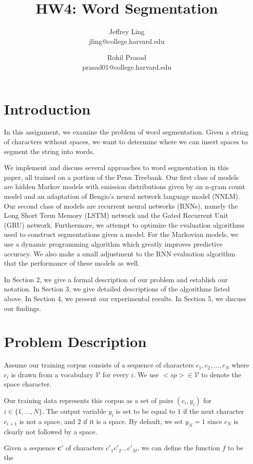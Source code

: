 \documentclass[11pt]{article}
\title{HW4: Word Segmentation}
\author{Jeffrey Ling \\ jling@college.harvard.edu \and Rohil Prasad \\ prasad01@college.harvard.edu }
\begin{document}
\maketitle{}
\section{Introduction}

In this assignment, we examine the problem of word segmentation. Given a string of characters without spaces, we want to determine where we can insert spaces to segment the string into words. 

We implement and discuss several approaches to word segmentation in this paper, all trained on a portion of the Penn Treebank. Our first class of models are hidden Markov models with emission distributions given by an n-gram count model and an adaptation of Bengio's neural network language model (NNLM). Our second class of models are recurrent neural networks (RNNs), namely the Long Short Term Memory (LSTM) network and the Gated Recurrent Unit (GRU) network. Furthermore, we attempt to optimize the evaluation algorithms used to construct segmentations given a model. For the Markovian models, we use a dynamic programming algorithm which greatly improves predictive accuracy. We also make a small adjustment to the RNN evaluation algorithm that the performance of these models as well. 

In Section 2, we give a formal description of our problem and establish our notation. In Section 3, we give detailed descriptions of the algorithms listed above. In Section 4, we present our experimental results. In Section 5, we discuss our findings.

\section{Problem Description}

Assume our training corpus consists of a sequence of characters $c_1, c_2, \dots, c_N$ where $c_i$ is drawn from a vocabulary $\mathcal{V}$ for every $i$. We use $<sp> \in \mathcal{V}$ to denote the space character. 

Our training data represents this corpus as a set of pairs $(c_i, y_i)$ for $i \in \{1, \dots, N\}$. The output variable $y_i$ is set to be equal to $1$ if the next character $c_{i+1}$ is not a space, and $2$ if it is a space. By default, we set $y_N = 1$ since $c_N$ is clearly not followed by a space. 

Given a sequence $\mathbf{c}'$ of characters $c'_1c'_2\dots c'_M$, we can define the function $f$ to be the %
\end{document}
